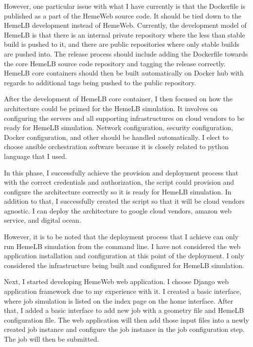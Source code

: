 However, one particular issue with what I have currently is that the Dockerfile is published as a part of the HemeWeb source code. It should be tied down to the HemeLB development instead of HemeWeb. Currently, the development model of HemeLB is that there is an internal private repository where the less than stable build is pushed to it, and there are public repositories where only stable builds are pushed into. The release process should include adding the Dockerfile towards the core HemeLB source code repository and tagging the release correctly. HemeLB core containers should then be built automatically on Docker hub with regards to additional tags being pushed to the public repository.


After the development of HemeLB core container, I then focused on how the architecture could be primed for the HemeLB simulation. It involves on configuring the servers and all supporting infrastructures on cloud vendors to be ready for HemeLB simulation. Network configuration, security configuration, Docker configuration, and other should be handled automatically. I elect to choose ansible orchestration software because it is closely related to python language that I used. 

In this phase, I successfully achieve the provision and deployment process that with the correct credentials and authorization, the script could provision and configure the architecture correctly so it is ready for HemeLB simulation. In addition to that, I successfully created the script so that it will be cloud vendors agnostic. I can deploy the architecture to google cloud vendors, amazon web service, and digital ocean.

However, it is to be noted that the deployment process that I achieve can only run HemeLB simulation from the command line. I have not considered the web application installation and configuration at this point of the deployment. I only considered the infrastructure being built and configured for HemeLB simulation.


Next, I started developing HemeWeb web application. I choose Django web application framework due to my experience with it. I created a basic interface, where job simulation is listed on the index page on the home interface. After that, I added a basic interface to add new job with a geometry file and HemeLB configuration file. The web application will then add those input files into a newly created job instance and configure the job instance in the job configuration step. The job will then be submitted. 

